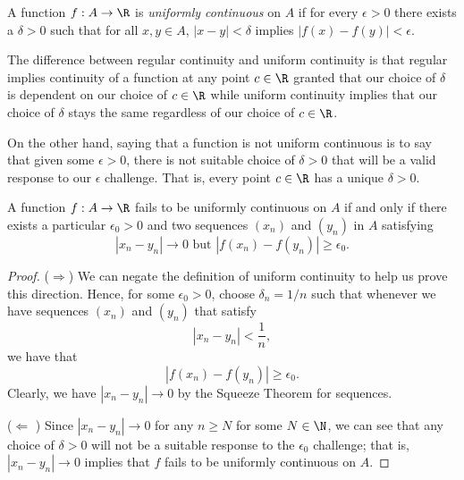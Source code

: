 \begin{tcolorbox}
\begin{defn}
A function \( f: A \to \R  \) is \textit{uniformly continuous} on \( A  \) if for every \( \epsilon > 0  \) there exists a \( \delta > 0  \) such that for all \( x,y \in A  \), \( | x - y  | < \delta  \) implies \( | f(x) - f(y) | < \epsilon. \)
\end{defn}
\end{tcolorbox}

The difference between regular continuity and uniform continuity is that regular implies continuity of a function at any point \( c \in \R  \) granted that our choice of \( \delta  \) is dependent on our choice of \( c \in \R  \) while uniform continuity implies that our choice of \( \delta  \) stays the same regardless of our choice of \( c \in \R  \).

On the other hand, saying that a function is not uniform continuous is to say that given some \( \epsilon > 0  \), there is not suitable choice of \( \delta > 0  \) that will be a valid response to our \( \epsilon  \) challenge. That is, every point \( c \in \R  \) has a unique \( \delta > 0   \).   

\begin{tcolorbox}
    \begin{thm}
    A function \( f: A \to \R  \) fails to be uniformly continuous on \( A  \) if and only if there exists a particular \( \epsilon_0 > 0  \) and two sequences \( (x_n) \) and \( (y_n) \) in \( A  \) satisfying 
    \[ | x_n - y_n  | \to 0 \text{~but~} | f(x_n) - f(y_n) | \geq \epsilon_0. \]
    \end{thm}
\end{tcolorbox}

\begin{proof}
    (\( \Rightarrow \)) We can negate the definition of uniform continuity to help us prove this direction. Hence, for some \( \epsilon_0 > 0  \), choose \( \delta_n = 1/n  \) such that whenever we have  sequences \( (x_n) \) and \( (y_n) \) that satisfy
    \[ | x_n - y_n  | < \frac{ 1 }{ n }, \]
we have that 
\[ | f(x_n) - f(y_n) | \geq \epsilon_0. \]
Clearly, we have \( | x_n - y_n | \to 0  \) by the Squeeze Theorem for sequences.

(\( \Leftarrow \) ) Since \( | x_n - y_n | \to 0  \) for any \( n \geq N   \) for some \( N \in \N  \), we can see that any choice of \( \delta > 0  \) will not be a suitable response to the \( \epsilon_0  \) challenge; that is, \( | x_n - y_n | \to 0  \) implies that \( f  \) fails to be uniformly continuous on \( A  \). 
\end{proof}


